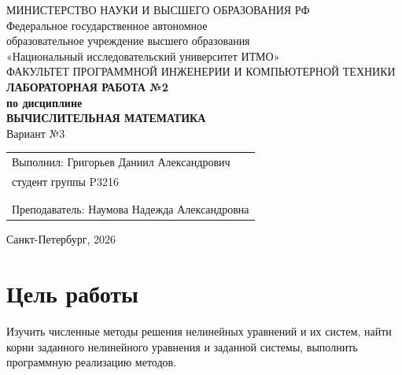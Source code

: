 ﻿\documentclass[12pt,a4paper]{article}
\begin{document}
\begin{titlepage}
\begin{center}
МИНИСТЕРСТВО НАУКИ И ВЫСШЕГО ОБРАЗОВАНИЯ РФ\\
Федеральное государственное автономное\\
образовательное учреждение высшего образования\\
«Национальный исследовательский университет ИТМО»\\[0.5em]
ФАКУЛЬТЕТ ПРОГРАММНОЙ ИНЖЕНЕРИИ И КОМПЬЮТЕРНОЙ ТЕХНИКИ\\[2em]

\textbf{ЛАБОРАТОРНАЯ РАБОТА №2}\\
\textbf{по дисциплине}\\
\textbf{ВЫЧИСЛИТЕЛЬНАЯ МАТЕМАТИКА}\\[0.5em]
Вариант №3\\[2em]
\end{center}

\vfill

\begin{flushright}
\begin{tabular}{@{}l@{}}
Выполнил:  Григорьев Даниил Александрович\\
студент группы P3216\\
\\
\\
Преподаватель:  Наумова Надежда Александровна\\
\end{tabular}
\end{flushright}

\vfill

\begin{center}
Санкт-Петербург, 2026
\end{center}
\end{titlepage}

\section*{Цель работы}
Изучить численные методы решения нелинейных уравнений и их систем, найти корни заданного нелинейного уравнения и заданной системы, выполнить программную реализацию методов.
\end{document}
